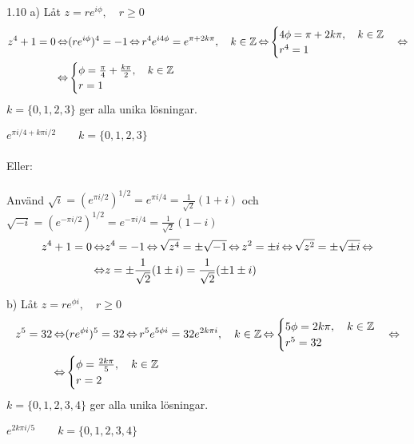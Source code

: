 \begin{task}{1.10 a)}
	Låt $z=re^{i\phi}, \quad r \ge 0$
	\begin{align*}
		z^4+1=0 \operatorname{\Leftrightarrow} 
		&(re^{i\phi})^4=-1 \operatorname{\Leftrightarrow}
		r^4e^{i4\phi}=e^{\pi+2k\pi}, \quad k\in\mathbb{Z} \operatorname{\Leftrightarrow}
		\begin{cases}
		4\phi=\pi+2k\pi, \quad k\in\mathbb{Z} \\
		r^4=1
		\end{cases} \operatorname{\Leftrightarrow} \\ \operatorname{\Leftrightarrow}
		&\begin{cases}
		\phi=\frac{\pi}{4}+\frac{k\pi}{2}, \quad k\in\mathbb{Z} \\
		r=1
		\end{cases}
	\end{align*}
	$k=\{0,1,2,3\}$ ger alla unika lösningar.
	
	\ans $e^{\pi i/4+k\pi i/2} \qquad k=\{0,1,2,3\}$
	\\ \\
	Eller:
	\\ \\
	Använd $\sqrt{i}=(e^{\pi i/2})^{1/2}=e^{\pi i/4}=\frac{1}{\sqrt{2}}(1+i)$ och $\sqrt{-i}=(e^{-\pi i/2})^{1/2}=e^{-\pi i/4}=\frac{1}{\sqrt{2}}(1-i)$
	\begin{align*}
	z^4+1=0 \operatorname{\Leftrightarrow} 
	&z^4=-1 \operatorname{\Leftrightarrow}
	\sqrt{z^4}=\pm\sqrt{-1} \operatorname{\Leftrightarrow}
	z^2=\pm i \operatorname{\Leftrightarrow}
	\sqrt{z^2}=\pm\sqrt{\pm i} \operatorname{\Leftrightarrow} \\ \operatorname{\Leftrightarrow}
	&z=\pm\frac{1}{\sqrt{2}}(1\pm i)=\frac{1}{\sqrt{2}}(\pm 1\pm i)
	\end{align*}
\end{task}

\begin{task}{b)}
	Låt $z=re^{\phi i}, \quad r \ge 0$
	\begin{align*}
		z^5=32 \operatorname{\Leftrightarrow}
		&(re^{\phi i})^5=32 \operatorname{\Leftrightarrow}
		r^5e^{5\phi i}=32e^{2k\pi i}, \quad k\in\mathbb{Z} \operatorname{\Leftrightarrow}
		\begin{cases}
		5\phi=2k\pi, \quad k\in\mathbb{Z} \\
		r^5=32
		\end{cases} \operatorname{\Leftrightarrow} \\ \operatorname{\Leftrightarrow}
		&\begin{cases}
		\phi=\frac{2k\pi}{5}, \quad k\in\mathbb{Z} \\
		r=2
		\end{cases}
	\end{align*}
	$k=\{0,1,2,3,4\}$ ger alla unika lösningar.
	
	\ans $e^{2k\pi i/5} \qquad k=\{0,1,2,3,4\}$
\end{task}

